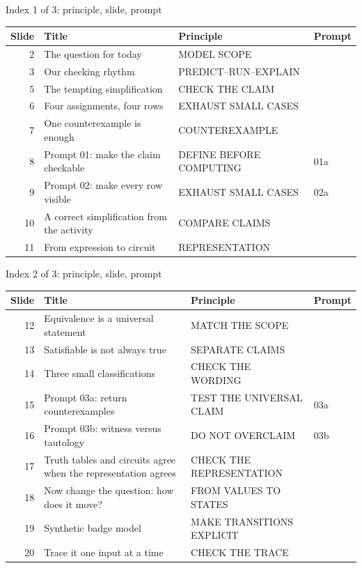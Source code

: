 \begin{frame}{Index 1 of 3: principle, slide, prompt}
\scriptsize
\begin{tabular}{@{}r>{\raggedright\arraybackslash}p{5.0cm}>{\raggedright\arraybackslash}p{4.8cm}p{1.1cm}@{}}
\textbf{Slide} & \textbf{Title} & \textbf{Principle} & \textbf{Prompt}\\\midrule
2 & The question for today & MODEL SCOPE & \\
3 & Our checking rhythm & PREDICT--RUN--EXPLAIN & \\
5 & The tempting simplification & CHECK THE CLAIM & \\
6 & Four assignments, four rows & EXHAUST SMALL CASES & \\
7 & One counterexample is enough & COUNTEREXAMPLE & \\
8 & Prompt 01: make the claim checkable & DEFINE BEFORE COMPUTING & 01a\\
9 & Prompt 02: make every row visible & EXHAUST SMALL CASES & 02a\\
10 & A correct simplification from the activity & COMPARE CLAIMS & \\
11 & From expression to circuit & REPRESENTATION & \\
\end{tabular}
\end{frame}
\begin{frame}{Index 2 of 3: principle, slide, prompt}
\scriptsize
\begin{tabular}{@{}r>{\raggedright\arraybackslash}p{5.0cm}>{\raggedright\arraybackslash}p{4.8cm}p{1.1cm}@{}}
\textbf{Slide} & \textbf{Title} & \textbf{Principle} & \textbf{Prompt}\\\midrule
12 & Equivalence is a universal statement & MATCH THE SCOPE & \\
13 & Satisfiable is not always true & SEPARATE CLAIMS & \\
14 & Three small classifications & CHECK THE WORDING & \\
15 & Prompt 03a: return counterexamples & TEST THE UNIVERSAL CLAIM & 03a\\
16 & Prompt 03b: witness versus tautology & DO NOT OVERCLAIM & 03b\\
17 & Truth tables and circuits agree when the representation agrees & CHECK THE REPRESENTATION & \\
18 & Now change the question: how does it move? & FROM VALUES TO STATES & \\
19 & Synthetic badge model & MAKE TRANSITIONS EXPLICIT & \\
20 & Trace it one input at a time & CHECK THE TRACE & \\
\end{tabular}
\end{frame}
